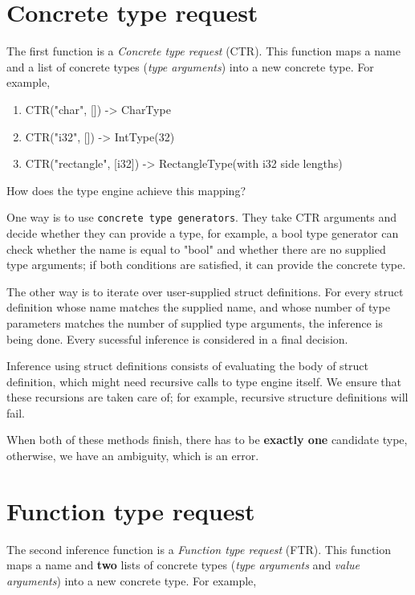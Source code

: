 \documentclass[times, utf8, diplomski]{fer}
\theoremstyle{definition}
\begin{document}
\section{Concrete type request}

The first function is a \textit{Concrete type request} (CTR). This function maps
a name and a list of concrete types (\textit{type arguments}) into a new concrete type. For example,

\begin{enumerate}
    \item CTR("char", []) -> CharType
    \item CTR("i32", []) -> IntType(32)
    \item CTR("rectangle", [i32]) -> RectangleType(with i32 side lengths)
\end{enumerate}

How does the type engine achieve this mapping? 

One way is to use \texttt{concrete type generators}.
They take CTR arguments and decide whether they can provide a type, for example,
a bool type generator can check whether the name is equal to "bool" and whether 
there are no supplied type arguments; if both conditions are satisfied,
it can provide the concrete type.

The other way is to iterate over user-supplied struct definitions.
For every struct definition whose name matches the supplied name, 
and whose number of type parameters matches the number of supplied type arguments,
the inference is being done. Every sucessful inference is considered in a final decision.

Inference using struct definitions consists of evaluating the body of struct definition,
which might need recursive calls to type engine itself. We ensure that these
recursions are taken care of; for example, recursive structure definitions will fail.

When both of these methods finish, there has to be \textbf{exactly one} candidate type,
otherwise, we have an ambiguity, which is an error.


\section{Function type request}

The second inference function is a \textit{Function type request} (FTR). This function maps
a name and \textbf{two} lists of concrete types (\textit{type arguments} and \textit{value arguments}) 
into a new concrete type. For example,
\end{document}
